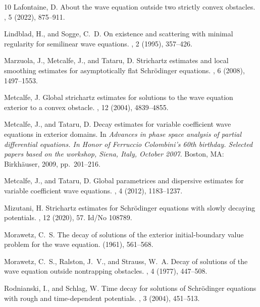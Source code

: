 \documentclass[10pt,leqno]{amsart}
\theoremstyle{definition}%
\theoremstyle{remark}
\numberwithin{equation}{section}
\renewcommand{\^}{\widehat}%
\begin{document}
\begin{thebibliography}{10}
{\sc Lafontaine, D.}
\newblock About the wave equation outside two strictly convex obstacles.
, 5 (2022), 875--911.

{\sc Lindblad, H., and Sogge, C.~D.}
\newblock On existence and scattering with minimal regularity for semilinear
  wave equations.
, 2 (1995), 357--426.

{\sc Marzuola, J., Metcalfe, J., and Tataru, D.}
\newblock Strichartz estimates and local smoothing estimates for asymptotically
  flat {S}chr\"odinger equations.
, 6 (2008), 1497--1553.

{\sc Metcalfe, J.}
\newblock Global strichartz estimates for solutions to the wave equation
  exterior to a convex obstacle.
, 12
  (2004), 4839--4855.

{\sc Metcalfe, J., and Tataru, D.}
\newblock Decay estimates for variable coefficient wave equations in exterior
  domains.
\newblock In {\em Advances in phase space analysis of partial differential
  equations. In Honor of Ferruccio Colombini's 60th birthday. Selected papers
  based on the workshop, Siena, Italy, October 2007}. Boston, MA:
  Birkh{\"a}user, 2009, pp.~201--216.

{\sc Metcalfe, J., and Tataru, D.}
\newblock Global parametrices and dispersive estimates for variable coefficient
  wave equations.
, 4 (2012), 1183--1237.

{\sc Mizutani, H.}
\newblock Strichartz estimates for {Schr{\"o}dinger} equations with slowly
  decaying potentials.
, 12 (2020), 57.
\newblock Id/No 108789.

{\sc Morawetz, C.~S.}
\newblock The decay of solutions of the exterior initial-boundary value problem
  for the wave equation.
 (1961), 561--568.

{\sc Morawetz, C.~S., Ralston, J.~V., and Strauss, W.~A.}
\newblock Decay of solutions of the wave equation outside nontrapping
  obstacles.
, 4 (1977), 447--508.

{\sc Rodnianski, I., and Schlag, W.}
\newblock Time decay for solutions of {Schr{\"o}dinger} equations with rough
  and time-dependent potentials.
, 3 (2004), 451--513.


\end{thebibliography}
\end{document}
